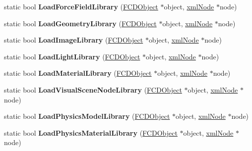 \begin{DoxyCompactItemize}
\item 
\hypertarget{classFArchiveXML_a2e9aaf9b0dd5aedc9850b186262a025a}{
static bool {\bfseries LoadForceFieldLibrary} (\hyperlink{classFCDObject}{FCDObject} $\ast$object, \hyperlink{struct__xmlNode}{xmlNode} $\ast$node)}
\label{classFArchiveXML_a2e9aaf9b0dd5aedc9850b186262a025a}

\item 
\hypertarget{classFArchiveXML_a4427f2b8a567a3613d7a0244545db4aa}{
static bool {\bfseries LoadGeometryLibrary} (\hyperlink{classFCDObject}{FCDObject} $\ast$object, \hyperlink{struct__xmlNode}{xmlNode} $\ast$node)}
\label{classFArchiveXML_a4427f2b8a567a3613d7a0244545db4aa}

\item 
\hypertarget{classFArchiveXML_a96422a34a7f453856cf6f45d49aabec2}{
static bool {\bfseries LoadImageLibrary} (\hyperlink{classFCDObject}{FCDObject} $\ast$object, \hyperlink{struct__xmlNode}{xmlNode} $\ast$node)}
\label{classFArchiveXML_a96422a34a7f453856cf6f45d49aabec2}

\item 
\hypertarget{classFArchiveXML_a63dc58e9b11e7c7ee8be2c9a0d9ac581}{
static bool {\bfseries LoadLightLibrary} (\hyperlink{classFCDObject}{FCDObject} $\ast$object, \hyperlink{struct__xmlNode}{xmlNode} $\ast$node)}
\label{classFArchiveXML_a63dc58e9b11e7c7ee8be2c9a0d9ac581}

\item 
\hypertarget{classFArchiveXML_afa15aa60106cba2de98e09e237e18dd4}{
static bool {\bfseries LoadMaterialLibrary} (\hyperlink{classFCDObject}{FCDObject} $\ast$object, \hyperlink{struct__xmlNode}{xmlNode} $\ast$node)}
\label{classFArchiveXML_afa15aa60106cba2de98e09e237e18dd4}

\item 
\hypertarget{classFArchiveXML_ad4f1cc28aa42bb78ba85b1ca5d087a50}{
static bool {\bfseries LoadVisualSceneNodeLibrary} (\hyperlink{classFCDObject}{FCDObject} $\ast$object, \hyperlink{struct__xmlNode}{xmlNode} $\ast$node)}
\label{classFArchiveXML_ad4f1cc28aa42bb78ba85b1ca5d087a50}

\item 
\hypertarget{classFArchiveXML_acbc677237e097554bb960022998575e0}{
static bool {\bfseries LoadPhysicsModelLibrary} (\hyperlink{classFCDObject}{FCDObject} $\ast$object, \hyperlink{struct__xmlNode}{xmlNode} $\ast$node)}
\label{classFArchiveXML_acbc677237e097554bb960022998575e0}

\item 
\hypertarget{classFArchiveXML_aae3b34c0bb8bf5fba3028bfb52d03755}{
static bool {\bfseries LoadPhysicsMaterialLibrary} (\hyperlink{classFCDObject}{FCDObject} $\ast$object, \hyperlink{struct__xmlNode}{xmlNode} $\ast$node)}
\label{classFArchiveXML_aae3b34c0bb8bf5fba3028bfb52d03755}


\end{DoxyCompactItemize}
